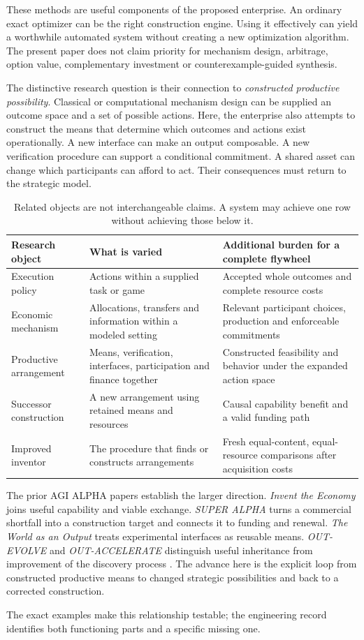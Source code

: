 These methods are useful components of the proposed enterprise. An ordinary exact optimizer can be the right construction engine. Using it effectively can yield a worthwhile automated system without creating a new optimization algorithm. The present paper does not claim priority for mechanism design, arbitrage, option value, complementary investment or counterexample-guided synthesis.

The distinctive research question is their connection to \emph{constructed productive possibility}. Classical or computational mechanism design can be supplied an outcome space and a set of possible actions. Here, the enterprise also attempts to construct the means that determine which outcomes and actions exist operationally. A new interface can make an output composable. A new verification procedure can support a conditional commitment. A shared asset can change which participants can afford to act. Their consequences must return to the strategic model.

\begin{table}[ht]
\small\centering
\begin{tabularx}{\linewidth}{@{}P{3.15cm}YY@{}}\toprule
Research object & What is varied & Additional burden for a complete flywheel\\\midrule
Execution policy & Actions within a supplied task or game & Accepted whole outcomes and complete resource costs\\
Economic mechanism & Allocations, transfers and information within a modeled setting & Relevant participant choices, production and enforceable commitments\\
Productive arrangement & Means, verification, interfaces, participation and finance together & Constructed feasibility and behavior under the expanded action space\\
Successor construction & A new arrangement using retained means and resources & Causal capability benefit and a valid funding path\\
Improved inventor & The procedure that finds or constructs arrangements & Fresh equal-content, equal-resource comparisons after acquisition costs\\\bottomrule
\end{tabularx}
\caption{Related objects are not interchangeable claims. A system may achieve one row without achieving those below it.}
\label{tab:objects}
\end{table}

The prior AGI ALPHA papers establish the larger direction. \emph{Invent the Economy} joins useful capability and viable exchange. \emph{SUPER ALPHA} turns a commercial shortfall into a construction target and connects it to funding and renewal. \emph{The World as an Output} treats experimental interfaces as reusable means. \emph{OUT-EVOLVE} and \emph{OUT-ACCELERATE} distinguish useful inheritance from improvement of the discovery process \cite{economy,superalpha,world,outevolve,outaccelerate}. The advance here is the explicit loop from constructed productive means to changed strategic possibilities and back to a corrected construction.

The exact examples make this relationship testable; the engineering record identifies both functioning parts and a specific missing one.
